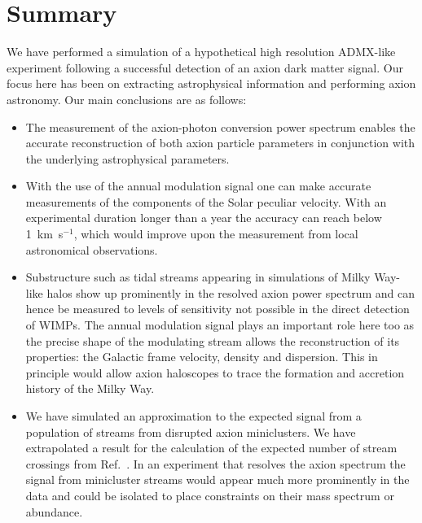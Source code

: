 \section{Summary}\label{sec:axions_summary}
We have performed a simulation of a hypothetical high resolution ADMX-like experiment following a successful detection of an axion dark matter signal. Our focus here has been on extracting astrophysical information and performing axion astronomy. Our main conclusions are as follows:
\begin{itemize}
\item The measurement of the axion-photon conversion power spectrum enables the accurate reconstruction of both axion particle parameters in conjunction with the underlying astrophysical parameters.
\item With the use of the annual modulation signal one can make accurate measurements of the components of the Solar peculiar velocity. With an experimental duration longer than a year the accuracy can reach below 1~km~s$^{-1}$, which would improve upon the measurement from local astronomical observations.
\item Substructure such as tidal streams appearing in simulations of Milky Way-like halos show up prominently in the resolved axion power spectrum and can hence be measured to levels of sensitivity not possible in the direct detection of WIMPs. The annual modulation signal plays an important role here too as the precise shape of the modulating stream allows the reconstruction of its properties: the Galactic frame velocity, density and dispersion. This in principle would allow axion haloscopes to trace the formation and accretion history of the Milky Way.
\item  We have simulated an approximation to the expected signal from a population of streams from disrupted axion miniclusters. We have extrapolated a result for the calculation of the expected number of stream crossings from Ref.~\cite{Tinyakov:2015cgg}. In an experiment that resolves the axion spectrum the signal from minicluster streams would appear much more prominently in the data and could be isolated to place constraints on their mass spectrum or abundance.
\end{itemize}

